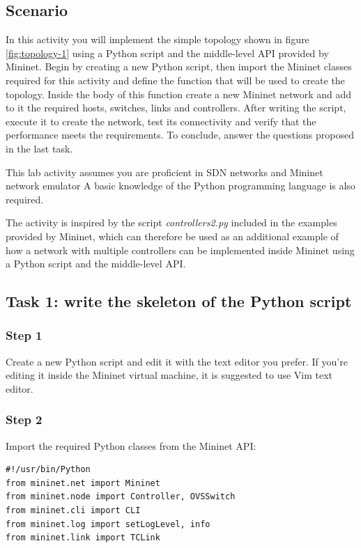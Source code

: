 \subsection*{Scenario}
In this activity you will implement the simple topology shown in figure \ref{fig:topology-1} using
a Python script and the middle-level API provided by Mininet.
Begin by creating a new Python script, then import the Mininet classes required for
this activity and define the function that will be used to create the topology.
Inside the body of this function create a new Mininet network and add to it the
required hosts, switches, links and controllers. After writing the script, execute
it to create the network, test its connectivity and verify that the performance
meets the requirements. To conclude, answer the questions proposed in the last task.

This lab activity assumes you are proficient in SDN networks and Mininet network
emulator %
A basic knowledge of the Python programming language is also required.

The activity is inspired by the script \textit{controllers2.py} \parencite{ref-3} included in the
examples provided by Mininet, which can therefore be used as
an additional example of how a network with multiple controllers can be implemented
inside Mininet using a Python script and the middle-level API.




\subsection*{Task 1: write the skeleton of the Python script}
\subsubsection*{Step 1}
Create a new Python script and edit it with the text editor you prefer. If you're editing
it inside the Mininet virtual machine, it is suggested to use Vim text editor.

\subsubsection*{Step 2}
Import the required Python classes from the Mininet API:
\begin{lstlisting}
#!/usr/bin/Python
from mininet.net import Mininet
from mininet.node import Controller, OVSSwitch
from mininet.cli import CLI
from mininet.log import setLogLevel, info
from mininet.link import TCLink
\end{lstlisting}

